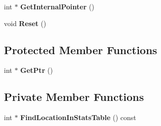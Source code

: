 \begin{DoxyCompactItemize}
\item 
int $\ast$ {\bfseries Get\+Internal\+Pointer} ()\hypertarget{classv8_1_1internal_1_1_stats_counter_a4f90a518642c3bcdc8e5aff05824c3bb}{}\label{classv8_1_1internal_1_1_stats_counter_a4f90a518642c3bcdc8e5aff05824c3bb}

\item 
void {\bfseries Reset} ()\hypertarget{classv8_1_1internal_1_1_stats_counter_ab65f7bdc9e5dc828bd375b942a5269e6}{}\label{classv8_1_1internal_1_1_stats_counter_ab65f7bdc9e5dc828bd375b942a5269e6}

\end{DoxyCompactItemize}
\subsection*{Protected Member Functions}
\begin{DoxyCompactItemize}
\item 
int $\ast$ {\bfseries Get\+Ptr} ()\hypertarget{classv8_1_1internal_1_1_stats_counter_a90c8a4714496542e2e6230b4bbfdbe77}{}\label{classv8_1_1internal_1_1_stats_counter_a90c8a4714496542e2e6230b4bbfdbe77}

\end{DoxyCompactItemize}
\subsection*{Private Member Functions}
\begin{DoxyCompactItemize}
\item 
int $\ast$ {\bfseries Find\+Location\+In\+Stats\+Table} () const \hypertarget{classv8_1_1internal_1_1_stats_counter_a6eb10f66c0ec5d5aec96fdf1254b35fc}{}\label{classv8_1_1internal_1_1_stats_counter_a6eb10f66c0ec5d5aec96fdf1254b35fc}

\end{DoxyCompactItemize}
